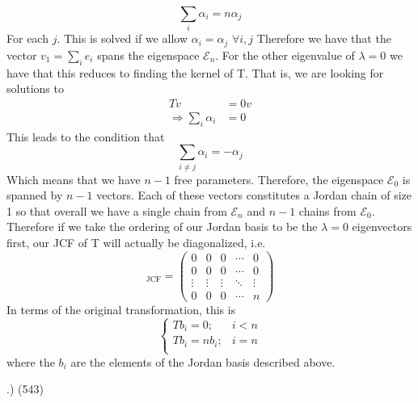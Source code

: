 \documentclass[a4paper, 11pt]{article}
\newenvironment{solution}{%
	\begin{list}{}{%
			\setlength{\topsep}{0pt}%
			\setlength{\leftmargin}{1.5cm}%
			\setlength{\rightmargin}{1.5cm}%
			\setlength{\listparindent}{\parindent}%
			\setlength{\itemindent}{\parindent}%
			\setlength{\parsep}{\parskip}%
		}%
		\item[]}{\end{list}}
\begin{document}
\begin{solution}
  \begin{equation*}
    \sum_i\alpha_i = n\alpha_j
  \end{equation*}
  For each $j$. This is solved if we allow $\alpha_i=\alpha_j$ $\forall i,j$ Therefore we have that the vector $v_1 = \sum_i e_i$ spans the eigenspace $\mathcal{E}_n$. For the other eigenvalue of $\lambda=0$ we have that this reduces to finding the kernel of T. That is, we are looking for solutions to
  \begin{align*}
    Tv &= 0v \\
    \Rightarrow \sum_i \alpha_i &= 0
  \end{align*}
  This leads to the condition that
  \begin{equation*}
    \sum_{i\neq j} \alpha_i= -\alpha_j
  \end{equation*}
  Which means that we have $n-1$ free parameters. Therefore, the eigenspace $\mathcal{E}_0$ is spanned by $n-1$ vectors. Each of these vectors constitutes a Jordan chain of size 1 so that overall we have a single chain from $\mathcal{E}_n$ and $n-1$ chains from $\mathcal{E}_0$. Therefore if we take the ordering of our Jordan basis to be the $\lambda=0$ eigenvectors first, our JCF of T will actually be diagonalized, i.e.
  \begin{equation*}
    [T]_\text{JCF} = \begin{pmatrix}
      0 & 0 & 0 & \cdots & 0 \\
      0 & 0 & 0 & \cdots & 0 \\
      \vdots & \vdots & \vdots & \ddots & \vdots \\
      0 & 0 & 0 & \cdots & n
    \end{pmatrix}
  \end{equation*}
  In terms of the original transformation, this is
  \begin{equation*}
    \begin{cases}
      Tb_i = 0; & i<n \\ 
      Tb_i = nb_i; & i=n\\
    \end{cases}
  \end{equation*}
  where the $b_i$ are the elements of the Jordan basis described above. \\
\end{solution}





.) (543) 
\end{document}
